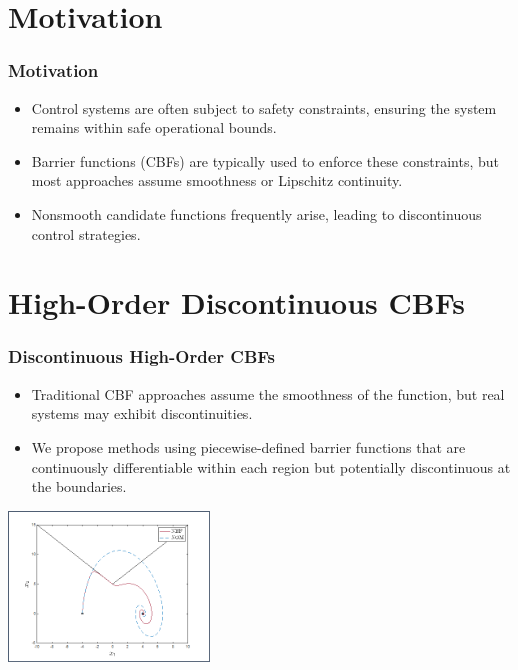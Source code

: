 \documentclass[aspectratio=169,xcolor=dvipsnames]{beamer}
\begin{document}
\section{Motivation}
\begin{frame}
    \frametitle{Motivation}
    \begin{itemize}
        \item Control systems are often subject to safety constraints, ensuring the system remains within safe operational bounds.
        \item Barrier functions (CBFs) are typically used to enforce these constraints, but most approaches assume smoothness or Lipschitz continuity.
        \item Nonsmooth candidate functions frequently arise, leading to discontinuous control strategies.
    \end{itemize}
\end{frame}

\section{High-Order Discontinuous CBFs}
\begin{frame}
    \frametitle{Discontinuous High-Order CBFs}
    \begin{itemize}
        \item Traditional CBF approaches assume the smoothness of the function, but real systems may exhibit discontinuities.
        \item We propose methods using piecewise-defined barrier functions that are continuously differentiable within each region but potentially discontinuous at the boundaries.
    \end{itemize}
    \vfill
    \centering
    \includegraphics[width=0.4\textwidth]{triple_integrator_system.png}  %
\end{frame}

\end{document}
